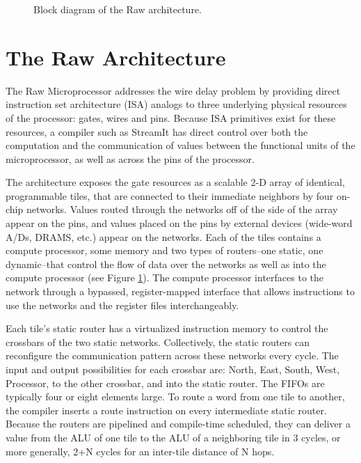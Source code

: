 
\begin{figure}
\centering
{}
\caption{Block diagram of the Raw architecture.
\protect\label{fig:raw-diagram}}
\end{figure}

\section{The Raw Architecture}
\label{sec:raw}

The Raw Microprocessor \cite{raw10,raw} addresses the wire delay
problem \cite{raw13} by providing direct instruction set architecture
(ISA) analogs to three underlying physical resources of the processor:
gates, wires and pins. Because ISA primitives exist for these
resources, a compiler such as StreamIt has direct control over both
the computation and the communication of values between the functional
units of the microprocessor, as well as across the pins of the
processor.

The architecture exposes the gate resources as a scalable 2-D array of
identical, programmable tiles, that are connected to their immediate
neighbors by four on-chip networks.  Values routed through the
networks off of the side of the array appear on the pins, and values
placed on the pins by external devices (wide-word A/Ds, DRAMS, etc.)
appear on the networks.  Each of the tiles contains a compute
processor, some memory and two types of routers--one static, one
dynamic--that control the flow of data over the networks as well as
into the compute processor (see Figure \ref{fig:raw-diagram}).  The
compute processor interfaces to the network through a bypassed,
register-mapped interface \cite{raw10} that allows instructions to use
the networks and the register files interchangeably.

Each tile's static router has a virtualized instruction memory to
control the crossbars of the two static networks. Collectively, the
static routers can reconfigure the communication pattern across these
networks every cycle.  The input and output possibilities for each
crossbar are: North, East, South, West, Processor, to the other
crossbar, and into the static router. The FIFOs are typically four or
eight elements large.  To route a word from one tile to another, the
compiler inserts a route instruction on every intermediate static
router.  Because the routers are pipelined and compile-time scheduled,
they can deliver a value from the ALU of one tile to the ALU of a
neighboring tile in 3 cycles, or more generally, 2+N cycles for an
inter-tile distance of N hops.

